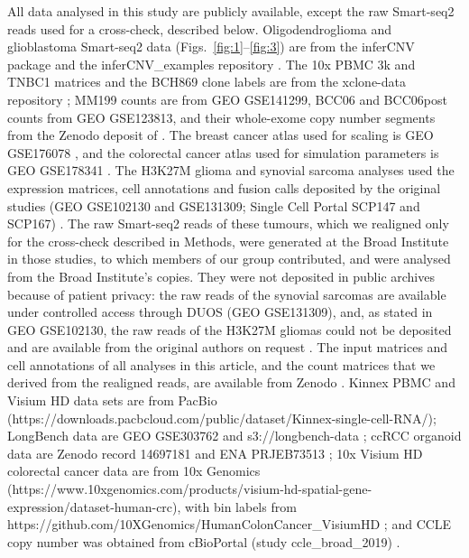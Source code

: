 All data analysed in this study are publicly available, except the raw Smart-seq2 reads used for a cross-check, described below. Oligodendroglioma and glioblastoma Smart-seq2 data (Figs.~\ref{fig:1}--\ref{fig:3}) are from the inferCNV package and the inferCNV\_examples repository \citep{tirosh2016oligo, patel2014}. The 10x PBMC 3k and TNBC1 matrices and the BCH869 clone labels are from the xclone-data repository \citep{tenx2016pbmc3k, xclonedata}; MM199 counts are from GEO GSE141299, BCC06 and BCC06post counts from GEO GSE123813, and their whole-exome copy number segments from the Zenodo deposit of \citet{schmid2025zenodoTruth}. The breast cancer atlas used for scaling is GEO GSE176078 \citep{wu2021breast}, and the colorectal cancer atlas used for simulation parameters is GEO GSE178341 \citep{pelka2021}. The H3K27M glioma and synovial sarcoma analyses used the expression matrices, cell annotations and fusion calls deposited by the original studies (GEO GSE102130 and GSE131309; Single Cell Portal SCP147 and SCP167) \citep{filbin2018, jerbyarnon2021}. The raw Smart-seq2 reads of these tumours, which we realigned only for the cross-check described in Methods, were generated at the Broad Institute in those studies, to which members of our group contributed, and were analysed from the Broad Institute's copies. They were not deposited in public archives because of patient privacy: the raw reads of the synovial sarcomas are available under controlled access through DUOS (GEO GSE131309), and, as stated in GEO GSE102130, the raw reads of the H3K27M gliomas could not be deposited and are available from the original authors on request \citep{filbin2018, jerbyarnon2021}. The input matrices and cell annotations of all analyses in this article, and the count matrices that we derived from the realigned reads, are available from Zenodo . Kinnex PBMC and Visium HD data sets are from PacBio (https://downloads.pacbcloud.com/public/dataset/Kinnex-single-cell-RNA/); LongBench data are GEO GSE303762 and s3://longbench-data \citep{you2025longbench}; ccRCC organoid data are Zenodo record 14697181 and ENA PRJEB73513 \citep{zajac2025ccrcc}; 10x Visium HD colorectal cancer data are from 10x Genomics (https://www.10xgenomics.com/products/visium-hd-spatial-gene-expression/dataset-human-crc), with bin labels from https://github.com/10XGenomics/HumanColonCancer\_VisiumHD \citep{oliveira2025visiumhd}; and CCLE copy number was obtained from cBioPortal (study ccle\_broad\_2019) \citep{cerami2012cbioportal, ghandi2019ccle}.
